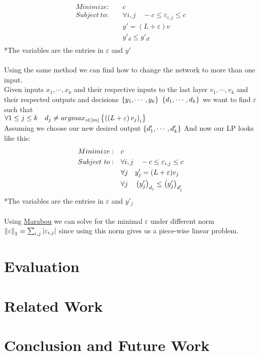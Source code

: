 \documentclass[a4paper]{llncs}
\begin{document}
\begin{align*}
    Minimize:\quad & c \\
    Subject\ to:\quad & \forall i,j\quad -c \leq\varepsilon_{i,j}\leq c\\
    & y'=(L+\varepsilon)v \\
    & y'_d \leq y'_{d'}\\
\end{align*}
\hspace*{5cm} *The variables are the entries in $\varepsilon$ and $y'$
\\\\
Using the same method we can find how to change the network to more than one input.\\
Given inputs $x_1,\cdots,x_k$ and their respective inputs to the last layer $v_1,\cdots,v_k$ and their respected outputs and decisions $\bracketsC{y_1,\cdots,y_k}\ \bracketsC{d_1,\cdots,d_k}$ we want to find $\varepsilon$ such that\\
$\forall 1\leq j\leq k\quad d_j \neq argmax_{i\in\left[m\right]}\left\lbrace \left(\left(L+\varepsilon\right)v_j\right)_i\right\rbrace$\\
Assuming we choose our new desired output
$\left\lbrace d'_1,\cdots,d'_k\right\rbrace$
And now our LP looks like this:\\
\begin{align*}
    Minimize:\quad & c \\
    Subject\ to:\quad & \forall i,j\quad -c \leq\varepsilon_{i,j}\leq c\\
    & \forall j\quad y'_j=(L+\varepsilon)v_j \\
    & \forall j\quad \left(y'_j\right)_{d_j} \leq \left(y'_j\right)_{d'_j}\\
\end{align*}
\hspace*{5cm} *The variables are the entries in $\varepsilon$ and
$y'_j$
\\\\
Using
\href{http://aisafety.stanford.edu/marabou/MarabouCAV2019.pdf}{Marabou}
we can solve for the minimal $\varepsilon$ under different norm
$\left\lVert\varepsilon\right\rVert_1=\sum_{i,j}\left\lvert\varepsilon_{i,j}\right\rvert$ since using
this norm gives us a piece-wise linear problem.

\section{Evaluation}
\label{sec:evaluation}

\section{Related Work}
\label{sec:relatedWork}

\section{Conclusion and Future Work}
\label{sec:conclusion}




\end{document}
